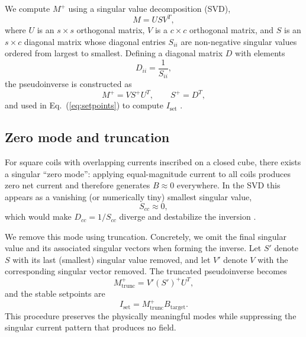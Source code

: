 \documentclass[preprint,12pt]{elsarticle}
\begin{document}
We compute $M^{+}$ using a singular value decomposition (SVD),
\begin{equation}
  M=USV^{T},
  \label{eq:svd}
\end{equation}
where $U$ is an $s\times s$ orthogonal matrix, $V$ is a $c\times c$ orthogonal matrix, and $S$ is an $s\times c$ diagonal matrix whose diagonal entries $S_{ii}$ are non-negative singular values ordered from largest to smallest. Defining a diagonal matrix $D$ with elements
\begin{equation}
  D_{ii}=\frac{1}{S_{ii}},
  \label{eq:Ddef}
\end{equation}
the pseudoinverse is constructed as
\begin{equation}
  M^{+}=VS^{+}U^{T},
  \qquad
  S^{+}=D^{T},
  \label{eq:pinv_svd}
\end{equation}
and used in Eq.~(\ref{eq:setpoints}) to compute $I_{\mathrm{set}}$ \cite{bib:klassen2026squares}.

\subsection{Zero mode and truncation}

For square coils with overlapping currents inscribed on a closed cube, there exists a singular ``zero mode'': applying equal-magnitude current to all coils produces zero net current and therefore generates $B\approx 0$ everywhere. In the SVD this appears as a vanishing (or numerically tiny) smallest singular value,
\begin{equation}
  S_{cc}\approx 0,
\end{equation}
which would make $D_{cc}=1/S_{cc}$ diverge and destabilize the inversion \cite{bib:klassen2026squares}.

We remove this mode using truncation. Concretely, we omit the final singular value and its associated singular vectors when forming the inverse. Let $S'$ denote $S$ with its last (smallest) singular value removed, and let $V'$ denote $V$ with the corresponding singular vector removed. The truncated pseudoinverse becomes
\begin{equation}
  M^{+}_{\mathrm{trunc}}=V'(S')^{+}U^{T},
  \label{eq:pinv_trunc}
\end{equation}
and the stable setpoints are
\begin{equation}
  I_{\mathrm{set}}=M^{+}_{\mathrm{trunc}}B_{\mathrm{target}}.
\end{equation}
This procedure preserves the physically meaningful modes while suppressing the singular current pattern that produces no field.
\end{document}
